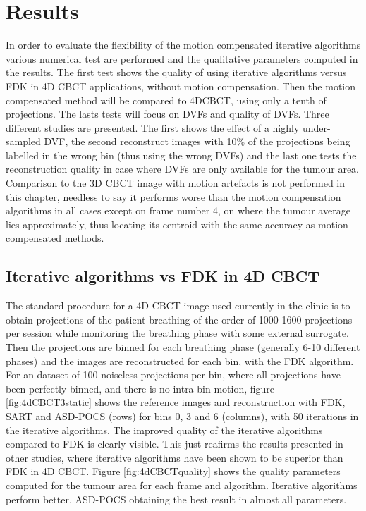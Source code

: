 \section{Results}

In order to evaluate the flexibility of the motion compensated iterative algorithms various numerical test are performed and the qualitative parameters computed in the results. The first test shows the quality of using iterative algorithms versus FDK in 4D CBCT applications, without motion compensation. Then the motion compensated method will be compared to 4DCBCT, using only a tenth of projections. The lasts tests will focus on DVFs and quality of DVFs. Three different studies are presented. The first shows the effect of a highly under-sampled DVF, the second reconstruct images with 10\% of the projections being labelled in the wrong bin (thus using the wrong DVFs) and the last one tests the reconstruction quality in case where DVFs are only available for the tumour area. Comparison to the 3D CBCT image with motion artefacts is not performed in this chapter, needless to say it performs worse than the motion compensation algorithms in all cases except on frame number 4, on where the tumour average lies approximately, thus locating its centroid with the same accuracy as motion compensated methods.

\subsection{Iterative algorithms vs FDK in 4D CBCT}
The standard procedure for a 4D CBCT image used currently in the clinic is to obtain projections of the patient breathing of the order of 1000-1600\cite{thengumpallil2016difference} projections per session while monitoring the breathing phase with some external surrogate. Then the projections are binned for each breathing phase (generally 6-10 different phases) and the images are reconstructed for each bin, with the FDK algorithm. For an dataset of 100 noiseless projections per bin, where all projections have been perfectly binned, and there is no intra-bin motion, figure \ref{fig:4dCBCT3static} shows the reference images and reconstruction with FDK, SART and ASD-POCS (rows) for bins 0, 3 and 6 (columns), with 50 iterations in the iterative algorithms. The improved quality of the iterative algorithms compared to FDK is clearly visible. This just reafirms the results presented in other studies\cite{schmidt2014clinical}\cite{shieh2014image}, where iterative algorithms have been shown to be superior than FDK in 4D CBCT. Figure \ref{fig:4dCBCTquality} shows the quality parameters computed for the tumour area for each frame and algorithm. Iterative algorithms perform better, ASD-POCS obtaining the best result in almost all parameters.
 
